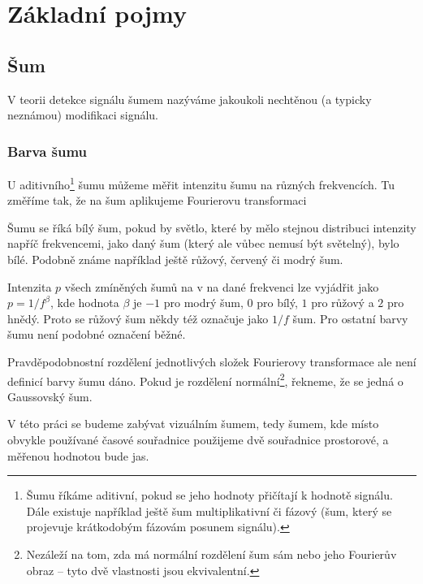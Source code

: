 \chapter{Základní pojmy}

\section{Šum}

V teorii detekce signálu šumem nazýváme jakoukoli nechtěnou (a typicky neznámou) modifikaci signálu.

\subsection{Barva šumu}

U aditivního\footnote{Šumu říkáme aditivní, pokud se jeho hodnoty přičítají k
hodnotě signálu. Dále existuje například ještě šum multiplikativní či fázový
(šum, který se projevuje krátkodobým fázovám posunem signálu).} šumu můžeme
měřit intenzitu šumu na různých frekvencích. Tu změříme tak, že na šum aplikujeme
Fourierovu transformaci

 Šumu se
říká bílý šum, pokud by světlo, které by mělo stejnou distribuci intenzity
napříč frekvencemi, jako daný šum (který ale vůbec nemusí být světelný), bylo
bílé. Podobně známe například ještě růžový, červený či modrý šum.

Intenzita $p$ všech zmíněných šumů na v na dané frekvenci lze vyjádřit jako
$p=1/f^\beta$, kde hodnota $\beta$ je $-1$ pro modrý šum, $0$ pro bílý, $1$ pro
růžový a $2$ pro hnědý. Proto se růžový šum někdy též označuje jako $1/f$ šum. Pro
ostatní barvy šumu není podobné označení běžné.

Pravděpodobnostní rozdělení jednotlivých složek Fourierovy transformace ale
není definicí barvy šumu dáno. Pokud je rozdělení normální\footnote{Nezáleží na
tom, zda má normální rozdělení šum sám nebo jeho Fourierův obraz -- tyto dvě
vlastnosti jsou ekvivalentní.}, řekneme, že se jedná o Gaussovský šum.  

V této práci se budeme zabývat vizuálním šumem, tedy šumem, kde místo obvykle
používané časové souřadnice použijeme dvě souřadnice prostorové, a měřenou
hodnotou bude jas. 

